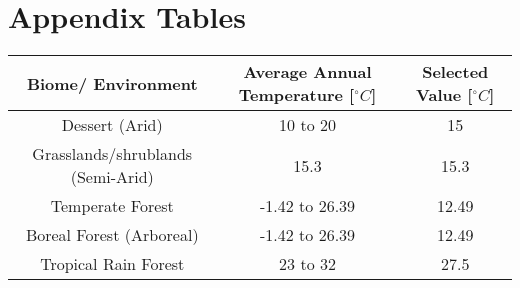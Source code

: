 \documentclass[12pt]{article}
\begin{document}
\section{Appendix Tables}

\begin{table}[H]
	\begin{center}
		\begin{tabular}{|c c c|} 
			\hline
			Biome/ Environment & Average Annual Temperature [$^{\circ}C$] & Selected Value [$^{\circ}C$]\\ [0.5ex] 
			\hline\hline
			Dessert (Arid) & 10 to 20 \cite{Davey2007} & 15 \\ 
			\hline
			Grasslands/shrublands (Semi-Arid) & 15.3 \cite{Pelaez1994} & 15.3 \\
			\hline
			Temperate Forest & -1.42 to 26.39 \cite{Zaz2019} & 12.49 \\
			\hline
			Boreal Forest (Arboreal)& -1.42 to 26.39 \cite{Zaz2019} & 12.49 \\
			\hline
			Tropical Rain Forest & 23 to 32 \cite{Paton2019} &27.5 \\
			\hline
		\end{tabular}
	\vspace*{-3ex}
	\label{table6}
	\end{center}
\end{table}
\end{document}

